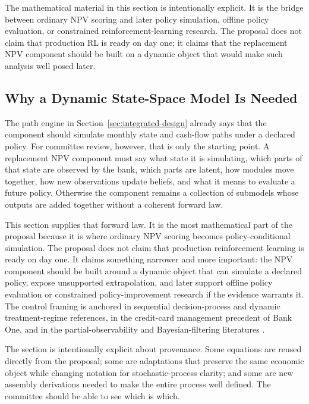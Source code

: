 \documentclass[11pt]{article}
\newcommand{\1}{\mathbf{1}}
\begin{document}
The mathematical material in this section is intentionally explicit.  It is the
bridge between ordinary NPV scoring and later policy simulation, offline policy
evaluation, or constrained reinforcement-learning research.  The proposal does
not claim that production RL is ready on day one; it claims that the replacement
NPV component should be built on a dynamic object that would make such analysis
well posed later.

\subsection{Why a Dynamic State-Space Model Is Needed}
\label{sec:state-space-assembly}

The path engine in Section~\ref{sec:integrated-design} already says that the
component should simulate monthly state and cash-flow paths under a declared
policy. For committee review, however, that is only the starting point. A
replacement NPV component must say what state it is simulating, which parts of
that state are observed by the bank, which parts are latent, how modules move
together, how new observations update beliefs, and what it means to evaluate a
future policy. Otherwise the component remains a collection of submodels whose
outputs are added together without a coherent forward law.

This section supplies that forward law. It is the most mathematical part of the
proposal because it is where ordinary NPV scoring becomes policy-conditional
simulation. The proposal does not claim that production reinforcement learning
is ready on day one. It claims something narrower and more important: the NPV
component should be built around a dynamic object that can simulate a declared
policy, expose unsupported extrapolation, and later support offline policy
evaluation or constrained policy-improvement research if the evidence warrants
it. The control framing is anchored in sequential decision-process and dynamic
treatment-regime references, in the credit-card management precedent of Bank
One, and in the partial-observability and Bayesian-filtering literatures
\citep{puterman1994mdp,murphy2003dynamic,trench2003bankone,
smallwood1973pomdp,kaelbling1998pomdp,durbinkoopman2012ssm,
westharrison1997bfdm,doucet2001smc}.

The section is intentionally explicit about provenance. Some equations are
reused directly from the proposal; some are adaptations that preserve the same
economic object while changing notation for stochastic-process clarity; and some
are new assembly derivations needed to make the entire process well defined. The
committee should be able to see which is which.
\end{document}
